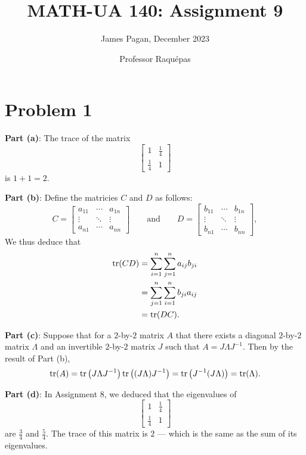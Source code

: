 \documentclass[11pt]{article}
\title{MATH-UA 140: Assignment 9}
\author{James Pagan, December 2023}
\date{Professor Raquépas}
\begin{document}
\maketitle
\tableofcontents
\newpage


\section{Problem 1}

\textbf{Part (a)}: The trace of the matrix
\[
	\begin{bmatrix} 1 & \tfrac{1}{4} \\ \tfrac{1}{4} & 1 \end{bmatrix}
\]
is $1 + 1 = \boxed{2}$.

\textbf{Part (b)}: Define the matricies $C$ and $D$ as follows:
\[
	C = \begin{bmatrix} a_{11} & \cdots & a_{1n} \\ \vdots & \ddots & \vdots \\ a_{n1} & \cdots & a_{nn} \end{bmatrix} \qquad \text{and} \qquad D = \begin{bmatrix} b_{11} & \cdots & b_{1n} \\ \vdots & \ddots & \vdots \\ b_{n1} & \cdots & b_{nn} \end{bmatrix},
\]
We thus deduce that
\begin{align*}
	\tr(CD) &= \sum_{i = 1}^{n} \sum_{j = 1}^{n} a_{ij} b_{ji} \\
			&= \sum_{j = 1}^{n} \sum_{i = 1}^{n} b_{ji} a_{ij} \\
			&= \tr(DC).
\end{align*}

\textbf{Part (c)}: Suppose that for a $2$-by-$2$ matrix $A$ that there exists a diagonal $2$-by-$2$ matrix $\Lambda$ and an invertible $2$-by-$2$ matrix $J$ such that $A = J \Lambda J^{-1}$. Then by the result of Part (b),
\[
	\tr(A) = \tr \left( J \Lambda J^{-1} \right) \tr\left( (J \Lambda) J^{-1} \right) = \tr \left( J^{-1} (J \Lambda) \right) = \tr(\Lambda).
\]

\textbf{Part (d)}: In Assignment 8, we deduced that the eigenvalues of 
\[
	\begin{bmatrix} 1 & \tfrac{1}{4} \\ \tfrac{1}{4} & 1 \end{bmatrix}
\]
are $\tfrac{3}{4}$ and $\tfrac{5}{4}$. The trace of this matrix is $2$ --- which is the same as the sum of its eigenvalues.
\end{document}
